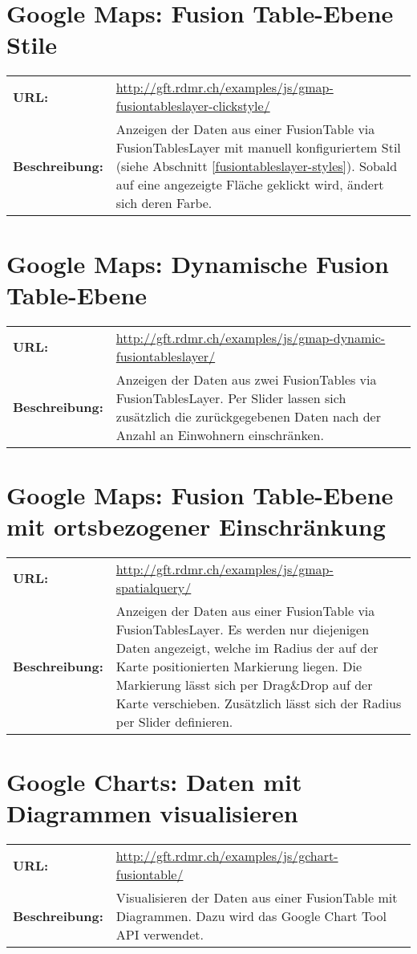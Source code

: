 {\section{Google Maps: Fusion Table-Ebene Stile}
\begin{tabular}{p{0.2\twocelltabwidth}p{0.8\twocelltabwidth}}
\textbf{URL:} & \url{http://gft.rdmr.ch/examples/js/gmap-fusiontableslayer-clickstyle/} \\ 
\textbf{Beschreibung:} & Anzeigen der Daten aus einer FusionTable via FusionTablesLayer mit manuell konfiguriertem Stil (siehe Abschnitt \ref{fusiontableslayer-styles}). Sobald auf eine angezeigte Fläche geklickt wird, ändert sich deren Farbe. \\ 
\end{tabular} 

\section{Google Maps: Dynamische Fusion Table-Ebene}
\begin{tabular}{p{0.2\twocelltabwidth}p{0.8\twocelltabwidth}}
\textbf{URL:} & \url{http://gft.rdmr.ch/examples/js/gmap-dynamic-fusiontableslayer/} \\ 
\textbf{Beschreibung:} & Anzeigen der Daten aus zwei FusionTables via FusionTablesLayer. Per Slider lassen sich zusätzlich die zurückgegebenen Daten nach der Anzahl an Einwohnern einschränken.  \\ 
\end{tabular} 

\section{Google Maps: Fusion Table-Ebene mit ortsbezogener Einschränkung}
\begin{tabular}{p{0.2\twocelltabwidth}p{0.8\twocelltabwidth}}
\textbf{URL:} & \url{http://gft.rdmr.ch/examples/js/gmap-spatialquery/} \\ 
\textbf{Beschreibung:} & Anzeigen der Daten aus einer FusionTable via FusionTablesLayer. Es werden nur diejenigen Daten angezeigt, welche im Radius der auf der Karte positionierten Markierung liegen. Die Markierung lässt sich per Drag{\&}Drop auf der Karte verschieben. Zusätzlich lässt sich der Radius per Slider definieren. \\ 
\end{tabular} 

\section{Google Charts: Daten mit Diagrammen visualisieren}
\begin{tabular}{p{0.2\twocelltabwidth}p{0.8\twocelltabwidth}}
\textbf{URL:} & \url{http://gft.rdmr.ch/examples/js/gchart-fusiontable/} \\ 
\textbf{Beschreibung:} & Visualisieren der Daten aus einer FusionTable mit Diagrammen. Dazu wird das Google Chart Tool API verwendet. \\ 
\end{tabular} 

}
